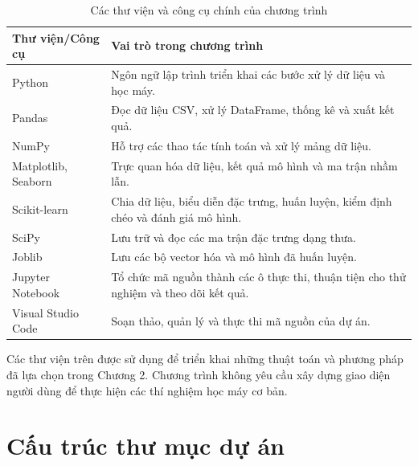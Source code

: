 \begin{table}[H]
\centering
\caption{Các thư viện và công cụ chính của chương trình}
\label{tab:thu-vien-chuong3}
\renewcommand{\arraystretch}{1.15}

\begin{tabularx}{\textwidth}{|p{}|X|}
\hline
\textbf{Thư viện/Công cụ} &
\textbf{Vai trò trong chương trình} \\
\hline

Python &
Ngôn ngữ lập trình triển khai các bước xử lý dữ liệu và học máy. \\
\hline

Pandas &
Đọc dữ liệu CSV, xử lý DataFrame, thống kê và xuất kết quả. \\
\hline

NumPy &
Hỗ trợ các thao tác tính toán và xử lý mảng dữ liệu. \\
\hline

Matplotlib, Seaborn &
Trực quan hóa dữ liệu, kết quả mô hình và ma trận nhầm lẫn. \\
\hline

Scikit-learn &
Chia dữ liệu, biểu diễn đặc trưng, huấn luyện, kiểm định chéo và đánh giá mô hình. \\
\hline

SciPy &
Lưu trữ và đọc các ma trận đặc trưng dạng thưa. \\
\hline

Joblib &
Lưu các bộ vector hóa và mô hình đã huấn luyện. \\
\hline

Jupyter Notebook &
Tổ chức mã nguồn thành các ô thực thi, thuận tiện cho thử nghiệm và theo dõi kết quả. \\
\hline

Visual Studio Code &
Soạn thảo, quản lý và thực thi mã nguồn của dự án. \\
\hline

\end{tabularx}
\end{table}

Các thư viện trên được sử dụng để triển khai những thuật toán và phương pháp đã lựa chọn trong Chương 2. Chương trình không yêu cầu xây dựng giao diện người dùng để thực hiện các thí nghiệm học máy cơ bản.



\section{Cấu trúc thư mục dự án}

